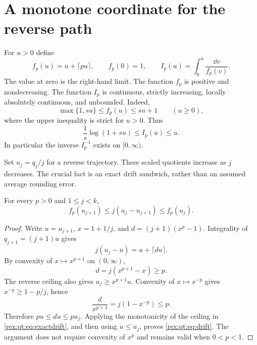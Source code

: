 \section{A monotone coordinate for the reverse path}\label{rex:qt:sec:coordinate}
For $u>0$ define
\begin{equation}\label{rex:qt:eq:fI}
 f_p(u)=u+\lceil pu\rceil,\qquad f_p(0)=1,\qquad
 I_p(u)=\int_0^u\frac{\dd v}{f_p(v)}.
\end{equation}
The value at zero is the right-hand limit. The function $f_p$ is positive and nondecreasing. The function $I_p$ is continuous, strictly increasing, locally absolutely continuous, and unbounded. Indeed,
\begin{equation}\label{rex:qt:eq:fbounds}
 \max\{1,su\}\le f_p(u)\le su+1\qquad(u\ge0),
\end{equation}
where the upper inequality is strict for $u>0$. Thus
\begin{equation}\label{rex:qt:eq:Ibasic}
 \frac1s\log(1+su)\le I_p(u)\le u.
\end{equation}
In particular the inverse $I_p^{-1}$ exists on $[0,\infty)$.

Set $u_j=q_j/j$ for a reverse trajectory. These scaled quotients increase as $j$ decreases. The crucial fact is an exact drift sandwich, rather than an assumed average rounding error.

\begin{lemma}\label{rex:qt:lem:drift}
For every $p>0$ and $1\le j<k$,
\begin{equation}\label{rex:qt:eq:drift}
 f_p(u_{j+1})\le j(u_j-u_{j+1})\le f_p(u_j).
\end{equation}
\end{lemma}
\begin{proof}
Write $u=u_{j+1}$, $x=1+1/j$, and $d=(j+1)(x^p-1)$. Integrality of $q_{j+1}=(j+1)u$ gives
\begin{equation}\label{rex:qt:eq:exactdrift}
 j(u_j-u)=u+\lceil du\rceil.
\end{equation}
By convexity of $x\mapsto x^{p+1}$ on $(0,\infty)$,
\[
 d=j(x^{p+1}-x)\ge p.
\]
The reverse ceiling also gives $u_j\ge x^{p+1}u$. Convexity of $x\mapsto x^{-p}$ gives $x^{-p}\ge1-p/j$, hence
\[
 \frac d{x^{p+1}}=j(1-x^{-p})\le p.
\]
Therefore $pu\le du\le pu_j$. Applying the monotonicity of the ceiling in \eqref{rex:qt:eq:exactdrift}, and then using $u\le u_j$, proves \eqref{rex:qt:eq:drift}. The argument does not require convexity of $x^p$ and remains valid when $0<p<1$.
\end{proof}

